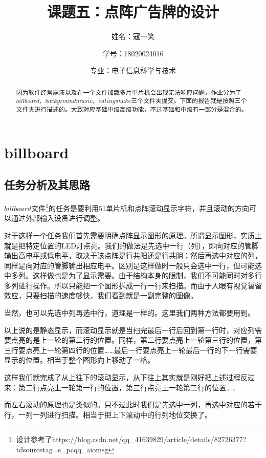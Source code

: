 \documentclass[UTF8]{ctexart}
\title{课题五：点阵广告牌的设计}
\author{姓名：寇一笑 \protect\newline
\and 学号：18020024016 \\
\and 专业：电子信息科学与技术}
\begin{document}
	\maketitle
	\renewcommand{\contentsname}{Contents}
	\tableofcontents
	\newpage
	
	\hypersetup{
	bookmarks=true,
	colorlinks=true,
	linkcolor=red,
	urlcolor=blue
	}
\begin{abstract}
因为软件经常崩溃以及在一个文件加载多片单片机会出现无法响应问题，作业分为了$billboard$、$background music$、$eating snake$三个文件夹提交。下面的报告就是按照三个文件夹进行描述的。大致对应基础中级高级功能，不过基础和中级有一部分是混合的。
\end{abstract}

	\section{billboard}
\subsection{任务分析及其思路}
$billboard$文件\footnote{设计参考了https://blog.csdn.net/qq_41639829/article/details/82726377?tdsourcetag=s_pcqq_aiomsg}的任务是要利用51单片机和点阵滚动显示字符，并且滚动的方向可以通过外部输入设备进行调整。\par
对于这样一个任务我们首先需要明确点阵显示图形的原理。所谓显示图形，实质上就是把特定位置的LED灯点亮。我们的做法是先选中一行（列），即向对应的管脚输出高电平或低电平，取决于该点阵是行共阳还是行共阴；然后再选中对应的列，同样是向对应的管脚输出相应电平。区别是这样做时一般只会选中一行，但可能选中多列。这样做也是为了显示需要。由于结构本身的限制，我们不可能同时对多行多列进行操作。所以只能把一个图形拆成一行一行来扫描。而由于人眼有视觉暂留效应，只要扫描的速度够快，我们看到就是一副完整的图像。\par
当然，也可以先选中列再选中行，道理是一样的。这里我们两种方法都要用到。\par
以上说的是静态显示，而滚动显示就是当扫完最后一行后回到第一行时，对应列需要点亮的是上一轮的第二行的位置。同样，第二行要点亮上一轮第三行的位置，第三行要点亮上一轮第四行的位置……最后一行要点亮上一轮最后一行的下一行需要显示的位置。相当于整个图形向上移动了一格。\par
这样我们就完成了从上往下的滚动显示，从下往上其实就是刚好把上述过程反过来：第二行点亮上一轮第一行的位置，第三行点亮上一轮第二行的位置……\par
而左右滚动的原理也是类似的。只不过此时我们是先选中一列，再选中对应的若干行，一列一列进行扫描。相当于把上下滚动中的行列地位交换了。
\end{document}
